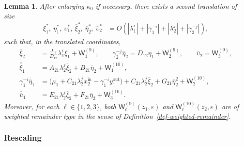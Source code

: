 \documentclass[11pt,a4paper]{article}
\theoremstyle{plain}
\newtheorem{lemma}[theorem]{Lemma}
\theoremstyle{definition}
\theoremstyle{plain}
\numberwithin{equation}{section}
\begin{document}
\begin{lemma}
\label{lem-shift-2}
After enlarging $\kappa_0$ if necessary, there exists a second translation of size
\begin{align*}
\xi_1^*,\ \eta_1^*,\ \upsilon_1^*,\ \overline{\xi}_2^*,\ \overline{\eta}_2^*,\ \overline{\upsilon}_2^*
&=
O(|\lambda_1^i| + |\gamma_1^{-i}| + |\lambda_2^j| + |\gamma_2^{-j}|),
\end{align*}
such that, in the translated coordinates,
\begin{equation}
\label{eq-pre-rescale}
\begin{aligned}
\overline{\xi}_2 &= \frac{J_{12}}{D_{12}}\lambda_1^i \xi_1 + \mathsf{W}_1^{(9)},
\qquad
\gamma_2^{-j}\overline{\eta}_2 = D_{12}\eta_1 + \mathsf{W}_2^{(9)},
\qquad
\overline{\upsilon}_2 = \mathsf{W}_3^{(9)}, \\
\overline{\overline{\xi}}_1 &= A_{21} \lambda_2^j \overline{\xi}_2 + B_{21}\overline{\eta}_2 + \mathsf{W}_1^{(10)},
\\
\gamma_1^{-i}\overline{\overline{\eta}}_1
&=
\bigl( \mu_1 + C_{21} \lambda_2^j x_2^\mathrm{in} - \gamma_1^{-i}y_1^\mathrm{out} \bigr)
+
C_{21}\lambda_2^j \overline{\xi}_2
+
G_{21}\overline{\eta}_2^2
+
\mathsf{W}_2^{(10)},
\\
\overline{\overline{\upsilon}}_1 &= E_{21} \lambda_2^j \overline{\xi}_2 + F_{21}\overline{\eta}_2 + \mathsf{W}_3^{(10)}.
\end{aligned}
\end{equation}
Moreover, for each $\ell \in \{1,2,3\}$, both $\mathsf{W}_\ell^{(9)}(z_1,\varepsilon)$ and $\mathsf{W}_\ell^{(10)}(z_2,\varepsilon)$ are of weighted remainder type in the sense of Definition~\ref{def-weighted-remainder}.
\end{lemma}
\subsubsection{Rescaling}
\end{document}
